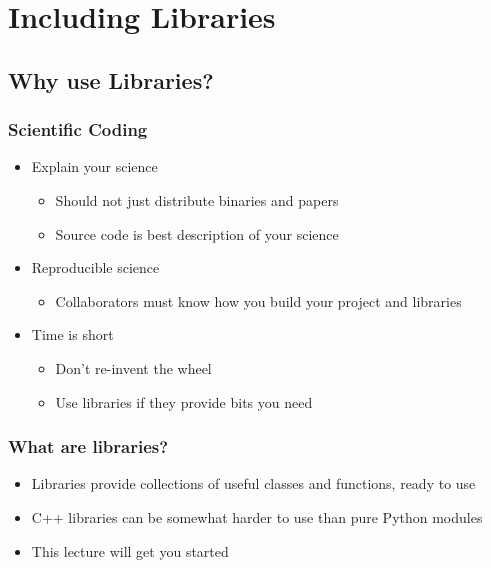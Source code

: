 \section{Including Libraries}\label{including-libraries}

\subsection{Why use Libraries?}\label{why-use-libraries}

\subsubsection{Scientific Coding}\label{scientific-coding}

\begin{itemize}
\itemsep1pt\parskip0pt
\item
  Explain your science

  \begin{itemize}
  \itemsep1pt\parskip0pt
  \item
    Should not just distribute binaries and papers
  \item
    Source code is best description of your science
  \end{itemize}
\item
  Reproducible science

  \begin{itemize}
  \itemsep1pt\parskip0pt
  \item
    Collaborators must know how you build your project and libraries
  \end{itemize}
\item
  Time is short

  \begin{itemize}
  \itemsep1pt\parskip0pt
  \item
    Don't re-invent the wheel
  \item
    Use libraries if they provide bits you need
  \end{itemize}
\end{itemize}

\subsubsection{What are libraries?}\label{what-are-libraries}

\begin{itemize}
\itemsep1pt\parskip0pt
\item
  Libraries provide collections of useful classes and functions, ready
  to use
\item
  C++ libraries can be somewhat harder to use than pure Python modules
\item
  This lecture will get you started
\end{itemize}

